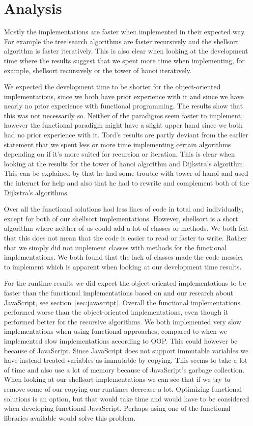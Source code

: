 \documentclass {article}
\begin{document}
\section{Analysis}
Mostly the implementations are faster when implemented in their expected way. For example the tree search algorithms are faster recursively and the shellsort algorithm is faster iteratively. This is also clear when looking at the development time where the results suggest that we spent more time when implementing, for example, shellsort recursively or the tower of hanoi iteratively. 

We expected the development time to be shorter for the object-oriented implementations, since we both have prior experience with it and since we have nearly no prior experience with functional programming. The results show that this was not necessarily so. Neither of the paradigms seem faster to implement, however the functional paradigm might have a slight upper hand since we both had no prior experience with it. Tord's results are partly deviant from the earlier statement that we spent less or more time implementing certain algorithms depending on if it's more suited for recursion or iteration. This is clear when looking at the results for the tower of hanoi algorithm and Dijkstra's algorithm. This can be explained by that he had some trouble with tower of hanoi and used the internet for help and also that he had to rewrite and complement both of the Dijkstra's algorithms.

Over all the functional solutions had less lines of code in total and individually, except for both of our shellsort implementations. However, shellsort is a short algorithm where neither of us could add a lot of classes or methods. We both felt that this does not mean that the code is easier to read or faster to write. Rather that we simply did not implement classes with methods for the functional implementations. We both found that the lack of classes made the code messier to implement which is apparent when looking at our development time results.

For the runtime results we did expect the object-oriented implementations to be faster than the functional implementations based on \cite{hasmadole} and our research about JavaScript, see section~\ref{sec:javascript}. Overall the functional implementations performed worse than the object-oriented implementations, even though it performed better for the recursive algorithms. We both implemented very slow implementations when using functional approaches, compared to when we implemented slow implementations according to OOP. This could however be because of JavaScript. Since JavaScript does not support immutable variables we have instead treated variables as immutable by copying. This seems to take a lot of time and also use a lot of memory because of JavaScript's garbage collection. When looking at our shellsort implementations we can see that if we try to remove some of our copying our runtimes decrease a lot. Optimizing functional solutions is an option, but that would take time and would have to be considered when developing functional JavaScript. Perhaps using one of the functional libraries available would solve this problem.
\end{document}
